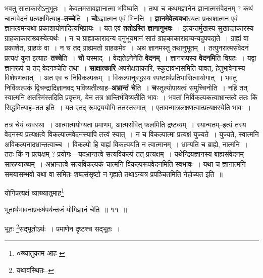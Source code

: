 \documentclass[article,12pt,a4paper]{memoir}
\begin{document}
	  \pstart भवतु साताकारोऽनुभूतः । केवलमसावज्ञानात्मा भविष्यति । तथा च कथमज्ञानेन ज्ञानात्मसंवेदनम् ? कथं चात्मवेदनं प्रत्यक्षमित्याह--\textbf{तच्चे}ति । \textbf{चो}ऽज्ञात्मन एवं भिनत्ति । \textbf{ज्ञानमेवेत्यवधा}रयतः प्रकाशात्मन एवं ज्ञानत्वमन्यथा प्रकाशायोगादित्यभिप्रायः । यत एवं \textbf{ततोऽस्ति ज्ञानानुभवः} । इत्यन्तर्मुखस्य सुखाद्याकारस्य ग्राहकाकाराख्यस्येत्यर्थः । न च ग्राह्याकारादन्य दनुभूयमानं सातं ग्राहकाकारादप्यन्यदुपपद्यते । ग्राह्यं वा प्रकाशेत, ग्राहकं वा । न च तद् ग्राह्यमतो ग्राहकमेव । अथ ज्ञानमस्तु तथानुभूतम् । तत्पुनरात्मसंवेदनं प्रत्यक्षं कुत इत्याह--\textbf{तच्चे}ति । \textbf{चो} यस्माद् । वेद्यतेऽनेनेति \textbf{वेदनम्} । ज्ञानरूपस्य \textbf{वेदनमि}ति विग्रहः\leavevmode{} । यद्वा ज्ञानरूपं च तद् वेदनञ्चेति तथा । \textbf{साक्षात्कारि} अपरोक्षताकारि, स्कुटावभासमिति यावत्, हेतुभावेनास्य विशेषणत्वात् । अत एव च निर्विकल्पकम् । विकल्पानुबद्धस्य स्पष्टार्थप्रतिभासित्वायोगात् । भवतु निर्विकल्पकं द्विचन्द्रादिज्ञानवद् भविष्यतीत्याह--\textbf{अभ्रान्तं चे}ति । \textbf{च}स्तुल्योपायत्वं समुच्चिनोति । नहि तत् स्वात्मनि अतस्मिंस्तदिति प्रवृत्तम्, येन तत्र भ्रान्तिर्भविष्यतीति भावः । भवतां निर्विकल्पकत्वाभ्रान्तत्वे ततः किं सिद्धमित्याह--तत इति । यत एतद् रूपद्वययोगि ततस्तस्मात् । एतावन्मात्रलक्षणत्वात्प्रत्यक्षस्येति भावः ।
	\pend
      

	  \pstart तत्र चेयं व्यवस्था । आत्मात्मयोग्यता प्रमाणम्, आत्मसंवित् फलमिति द्रष्टव्यम् । स्यान्मतम्--इत्यं तस्य वेदनस्य प्रत्यक्षत्वे विकल्पात्मवेदनस्यापि तत्त्वं स्यात् । न च विकल्पात्मा प्रत्यक्षं युज्यते । युज्यते, स्वात्मनि अविकल्पनादभ्रान्तत्वाच्च । विकल्पो हि बाह्यं विकल्पयति न त्वात्मानम् । भ्राम्यति च ब्राह्ये, नात्मनि । ततः किं न प्रत्यक्षम् ? प्रयोगः—यदभ्रान्तत्वे सत्यविकल्पं तत् प्रत्यक्षम् । यथेन्द्रियज्ञानस्य बाह्यसंवेदनम् सारूप्याख्यम् । अभ्रान्तत्वे सत्यविकल्पकं चात्मनि विकल्परूपवेदनमिति स्वभावः । यथा च ज्ञानात्मनि समयासम्भवो यथा वा समितः शब्दसंसृष्टो न गृह्यते तथाऽन्यत्र प्रपञ्चितमिति नेहोच्यत इति ॥
	\pend
      \leavevmode{}
	  \bigskip
	  \begingroup
	

	  \pstart योगिप्रत्यक्षं व्याख्यातुमाह\footnote{०ख्यातुकाम आह \cite{dp-msC} \cite{dp-msD}}
	\pend
      
	  \endgroup
	
	  \bigskip
	  \begingroup
	

	  \pstart भूतार्थभावनाप्रकर्षपर्यन्तजं योगिज्ञानं चेति ॥ ११ ॥
	\pend
      
	  \endgroup
	

	  \pstart भूतः \footnote{यथावस्थितः--\cite{dp-msD-n}}सद्भूतोऽर्थः । प्रमाणेन दृष्टश्च सद्भूतः ।
	\pend
      
\end{document}
